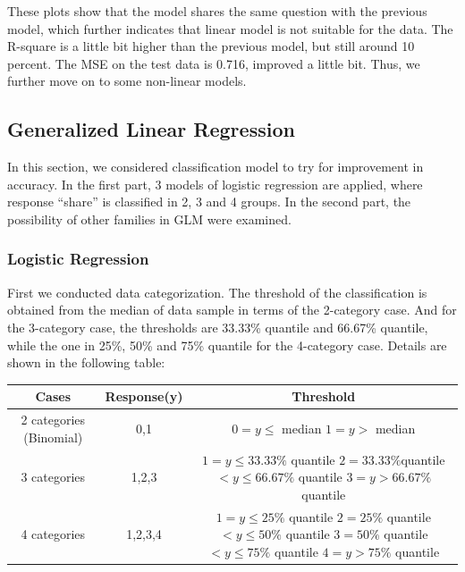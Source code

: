 \documentclass[letterpaper,12pt]{article}
\begin{document}
These plots show that the model shares the same question with the previous model, which further indicates that linear model is not suitable for the data. The R-square is a little bit higher than the previous model, but still around 10 percent. The MSE on the test data is 0.716, improved a little bit. Thus, we further move on to some non-linear models.

\subsection{Generalized Linear Regression}
In this section, we considered classification model to try for improvement in accuracy. In the first part, 3 models of logistic regression are applied, where response “share” is classified in 2, 3 and 4 groups. In the second part, the possibility of other families in GLM were examined. 
\subsubsection{Logistic Regression}
First we conducted data categorization. The threshold of the classification is obtained from the median of data sample in terms of the 2-category case. And for the 3-category case, the thresholds are 33.33\% quantile and 66.67\% quantile, while the one in 25\%, 50\% and 75\% quantile for the 4-category case. Details are shown in the following table:
\begin{center}
 \begin{tabular}{||c c c ||} 
 \hline
 Cases & Response(y) & Threshold \\ [0.5ex] 
 \hline\hline
 2 categories (Binomial) & 0,1 & \makecell[c]{$0 = y\leq$ median\\ $1 = y >$ median} \\ 
 \hline
 3 categories & 1,2,3 & \makecell[c]{$1 = y \leq 33.33\%$ quantile\\
$2 = 33.33\% $quantile $< y \leq 66.67\%$ quantile\\
$3 = y > 66.67\%$ quantile} \\
 \hline
 4 categories & 1,2,3,4 & \makecell[c]{$1 = y \leq 25\%$ quantile\\
$2 = 25\%$ quantile $< y \leq 50\%$ quantile\\
$3 = 50\%$ quantile $< y \leq 75\%$ quantile\\
$4 = y > 75\%$ quantile }\\ [1ex] 
 \hline
\end{tabular}
\end{center}
\end{document}

